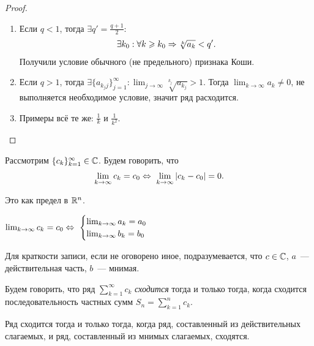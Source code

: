 \documentclass[../main.tex]{subfiles}
\begin{document}
\begin{proof} 
    \begin{enumerate}
        \item Если $ q< 1$, тогда $ \exists q' = \frac{q+1}{2} :$ 
        \begin{gather} 
          \exists k_0 : \forall k \geqslant k_0 \Rightarrow \sqrt[k]{a_k } < q' .
        \end{gather}  
        Получили условие обычного (не предельного) признака Коши.
        \item Если $ q > 1$, тогда $ \exists \{ a_{k_jj} \}_{j = 1}^{\infty} : \lim_{j \to \infty} \sqrt[k_j ]{a_{k_j }} > 1$. Тогда $ \lim_{k \to \infty} a_k   \neq 0$, не выполняется необходимое условие, значит ряд расходится.
        \item Примеры всё те же: $ \frac{1}{k}$ и $ \frac{1}{k^2}$.     
    \end{enumerate}

\end{proof}


\begin{definition}
  Рассмотрим $ \{ c_{k} \}_{k = 1}^{\infty} \in \mathbb{C} $. Будем говорить, что \begin{gather}
    \lim_{k \to \infty} c_k = c_0 \Leftrightarrow~ \lim_{k \to \infty} \left| c_k - c_0  \right| = 0.
  \end{gather}
\end{definition}


\begin{note}
  Это как предел в $ \mathbb{R}^n$. 
\end{note}


\begin{corollary}
  $ \lim_{k \to \infty} c_k = c_0 \Leftrightarrow~ \begin{cases}\lim_{k \to \infty} a_k = a_0 \\ \lim_{k \to \infty} b_k = b_0 \end{cases}$ 
\end{corollary}


\begin{note}
  Для краткости записи, если не оговорено иное, подразумевается, что $ c \in \mathbb{C}$, $ a$~--- действительная часть, $b$~--- мнимая. 
\end{note}


\begin{definition}
  Будем говорить, что ряд $ \sum_{k=1}^{\infty} c_k  $ \emph{сходится} тогда и только тогда, когда сходится последовательность частных сумм $ S_n = \sum_{k=1}^{n} c_k  $. 
\end{definition}


\begin{note}
  Ряд сходится тогда и только тогда, когда ряд, составленный из действительных слагаемых, и ряд, составленный из мнимых слагаемых, сходятся.
\end{note}
\end{document}
